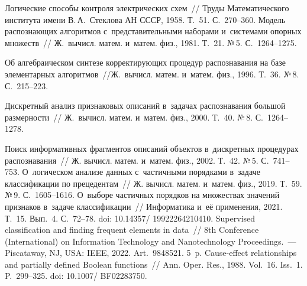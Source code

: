\begin{multicols}{2}
  \vspace*{-4pt}
  
{\small\frenchspacing
 { %
 \begin{thebibliography}{99}
 
  \vspace*{-2pt}
  
 Логические способы конт\-ро\-ля электрических схем~// 
Труды Математического института имени В.\,А.~Стеклова АН СССР, 1958. Т.~51.  
С.~270--360. 
 Модель рас\-по\-зна\-ющих алгоритмов 
с~пред\-ста\-ви\-тель\-ны\-ми наборами и~сис\-те\-ма\-ми опор\-ных множеств~// Ж.~вычисл. матем. 
и~матем. физ., 1981. Т.~21. №\,5. С.~1264--1275.

 Об ал\-геб\-ра\-и\-че\-ском синтезе  
кор\-рек\-ти\-ру\-ющих процедур рас\-по\-зна\-ва\-ния на базе элементарных алгоритмов~//\linebreak Ж.~вычисл. матем. и~матем. физ., 1996. Т.~36. №\,8. С.~215--223.

 Дискретный анализ признаковых описаний в~задачах 
рас\-по\-зна\-ва\-ния большой раз\-мер\-ности~// Ж.~вычисл. матем. и~матем. физ., 2000. Т.~40. 
№\,8. С.~1264--1278.

 Поиск информативных фрагментов описаний объектов 
в~дис\-крет\-ных процедурах распознавания~// Ж. вычисл. матем. и~матем. физ., 2002. Т.~42. 
№\,5. С.~741--753.
 О~логическом анализе данных 
с~час\-тич\-ны\-ми порядками в~задаче классификации по прецедентам~// Ж. вычисл. матем. и~матем. физ., 2019. Т.~59. №\,9. С.~1605--1616.
 О~выборе час\-тич\-ных порядков на множествах 
значений при\-зна\-ков в~задаче классификации~// Информатика и~её применения, 2021. Т.~15. 
Вып.~4. С.~72--78. doi: 10.14357/ 19922264210410.
 Supervised classification and finding 
frequent elements in data~// 8th  Conference (International) on Information Technology and 
Nanotechnology Proceedings.~--- Piscataway, NJ, USA: IEEE, 2022. Art.~9848521. 5~p.
 Cause-effect relationships and partially defined 
Boolean functions~// Ann. Oper. Res., 1988. Vol.~16. Iss.~1. P.~299--325. doi: 
10.1007/ BF02283750.


\end{thebibliography}}}
\end{multicols}

